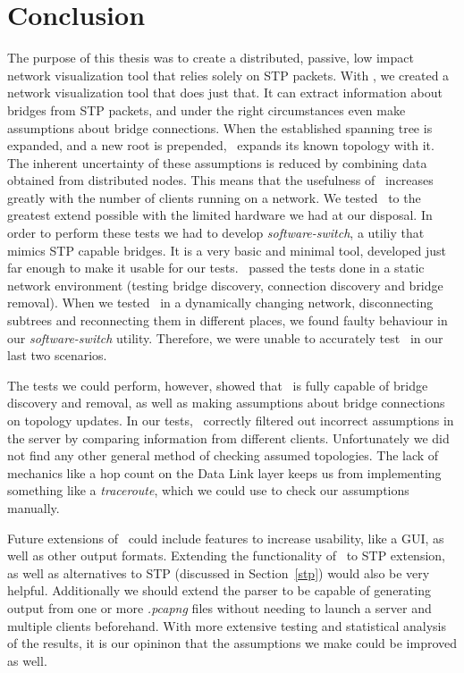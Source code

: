 \chapter{Conclusion}
\label{conclusion}
The purpose of this thesis was to create a distributed, passive, low impact network visualization tool that relies solely on STP packets.
With \tool, we created a network visualization tool that does just that.
It can extract information about bridges from STP packets, and under the right circumstances even make assumptions about bridge connections.
When the established spanning tree is expanded, and a new root is prepended, \tool\ expands its known topology with it.
The inherent uncertainty of these assumptions is reduced by combining data obtained from distributed nodes.
This means that the usefulness of \tool\ increases greatly with the number of clients running on a network.
We tested \tool\ to the greatest extend possible with the limited hardware we had at our disposal.
In order to perform these tests we had to develop \textit{software-switch}, a utiliy that mimics STP capable bridges.
It is a very basic and minimal tool, developed just far enough to make it usable for our tests.
\tool\ passed the tests done in a static network environment (testing bridge discovery, connection discovery and bridge removal).
When we tested \tool\ in a dynamically changing network, disconnecting subtrees and reconnecting them in different places, we found faulty behaviour in our \textit{software-switch} utility. %
Therefore, we were unable to accurately test \tool\ in our last two scenarios.

The tests we could perform, however, showed that \tool\ is fully capable of bridge discovery and removal, as well as making assumptions about bridge connections on topology updates.
In our tests, \tool\ correctly filtered out incorrect assumptions in the server by comparing information from different clients.
Unfortunately we did not find any other general method of checking assumed topologies.
The lack of mechanics like a hop count on the Data Link layer keeps us from implementing something like a \textit{traceroute}, which we could use to check our assumptions manually.

Future extensions of \tool\ could include features to increase usability, like a GUI, as well as other output formats.
Extending the functionality of \tool\ to STP extension, as well as alternatives to STP (discussed in Section~\ref{stp}) would also be very helpful.
Additionally we should extend the parser to be capable of generating output from one or more \textit{.pcapng} files without needing to launch a server and multiple clients beforehand.
With more extensive testing and statistical analysis of the results, it is our opininon that the assumptions we make could be improved as well.

